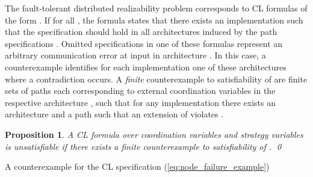 \documentclass{LMCS}
\theoremstyle{plain}\newtheorem{theorem}[thm]{Theorem}
\theoremstyle{plain}\newtheorem{lemma}[thm]{Lemma}
\theoremstyle{plain}\newtheorem{proposition}[thm]{Proposition}
\theoremstyle{plain}\newtheorem{corollary}[thm]{Corollary}
\theoremstyle{definition}\newtheorem{definition}{Definition}[section]
\begin{document}
The fault-tolerant distributed realizability problem corresponds to  CL formulas of the form .
If  for all , the formula states that there exists an implementation such that the specification  should hold in all architectures induced by the path specifications .
Omitted specifications  in one of these formulas  represent an arbitrary communication error at input  in architecture .
In this case, a counterexample identifies for each implementation one of these architectures where a contradiction occurs.
A \emph{finite} counterexample to satisfiability of  are  finite sets of paths  each corresponding to external coordination variables  in the respective architecture , such that for any implementation  there exists an architecture  and a path  such that an extension  of  violates .
\begin{proposition} \label{eq:dr_with_faults_finite_unsatisfiability}
  A CL formula  over coordination variables  and strategy variables  is unsatisfiable if there exists a finite counterexample to satisfiability of . \qed
\end{proposition}\noindent
A counterexample for the CL specification (\ref{eq:node_failure_example})
\end{document}
